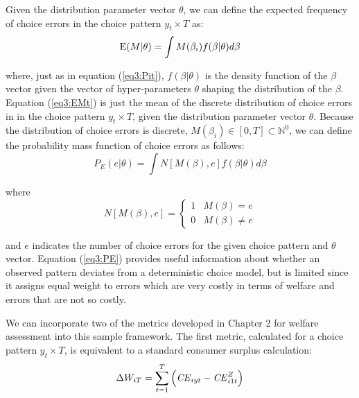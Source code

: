 \documentclass[../main.tex]{subfiles}
\begin{document}
\noindent Given the distribution parameter vector $\theta$, we can define the expected frequency of choice errors in the choice pattern $y_t \times T$ as:
\begin{equation}
	\label{eq3:EMt}
	\operatorname{E}(M | \theta) = \int M(\beta_i) f(\beta | \theta) d\beta
\end{equation}

\noindent where, just as in equation (\ref{eq3:Pit}), $f(\beta|\theta)$ is the density function of the $\beta$ vector given the vector of hyper-parameters $\theta$ shaping the distribution of the $\beta$.
Equation (\ref{eq3:EMt}) is just the mean of the discrete distribution of choice errors in in the choice pattern $y_t \times T$, given the distribution parameter vector $\theta$.
Because the distribution of choice errors is discrete, $M(\beta_i) \in [0,T] \subset \mathbb{N}^0$, we can define the probability mass function of choice errors as follows{\footnotemark}:
\begin{equation}
	\label{eq3:PE}
	P_E(e | \theta) = \int N[M(\beta),e] f(\beta|\theta) d \beta
\end{equation}

\addtocounter{footnote}{-1}

\noindent where
\begin{equation}
	\label{eq3:NMB}
	N[M(\beta), e] =
	\begin{cases}
		1 & M(\beta) = e\\
		0 & M(\beta) \neq e
	\end{cases}
\end{equation}

\noindent and $e$ indicates the number of choice errors for the given choice pattern and $\theta$ vector.
Equation (\ref{eq3:PE}) provides useful information about whether an observed pattern deviates from a deterministic choice model, but is limited since it assigns equal weight to errors which are very costly in terms of welfare and errors that are not so costly.

We can incorporate two of the metrics developed in Chapter 2 for welfare assessment into this sample framework.
The first metric, calculated for a choice pattern $y_t \times T$, is equivalent to a standard consumer surplus calculation:
\begin{equation}
	\label{eq3:WST}
	\Delta W_{iT} = \sum_{t=1}^T \left( {\mathit{CE}}_{iyt} - {\mathit{CE}}_{i1t}^Z \right)
\end{equation}
\end{document}
